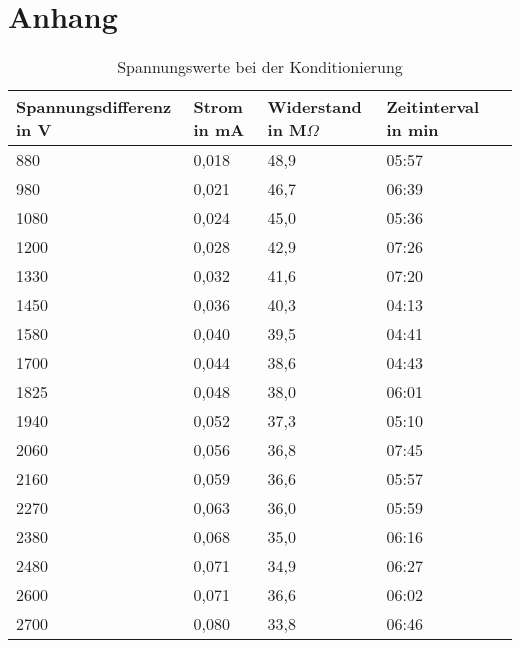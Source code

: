 \appendix
\chapter{Anhang}

\begin{table}
    \caption{Spannungswerte bei der Konditionierung}
    \label{tab:Konditionierung}
    \begin{tabular}[h]{l|l|l|l|l}
        Spannungsdifferenz in V & Strom in mA &	Widerstand in M$\Omega$ & Zeitinterval in min\\   
        \hline
            880  & 0,018 & 48,9 & 05:57\\
            980  & 0,021 & 46,7 & 06:39\\
            1080 & 0,024 & 45,0 & 05:36\\
            1200 & 0,028 & 42,9 & 07:26\\
            1330 & 0,032 & 41,6 & 07:20\\
            1450 & 0,036 & 40,3 & 04:13\\
            1580 & 0,040 & 39,5 & 04:41\\
            1700 & 0,044 & 38,6 & 04:43\\
            1825 & 0,048 & 38,0 & 06:01\\
            1940 & 0,052 & 37,3 & 05:10\\
            2060 & 0,056 & 36,8 & 07:45\\
            2160 & 0,059 & 36,6 & 05:57\\
            2270 & 0,063 & 36,0 & 05:59\\
            2380 & 0,068 & 35,0 & 06:16\\
            2480 & 0,071 & 34,9 & 06:27\\
            2600 & 0,071 & 36,6 & 06:02\\
            2700 & 0,080 & 33,8 & 06:46\\        
    \end{tabular}
\end{table}